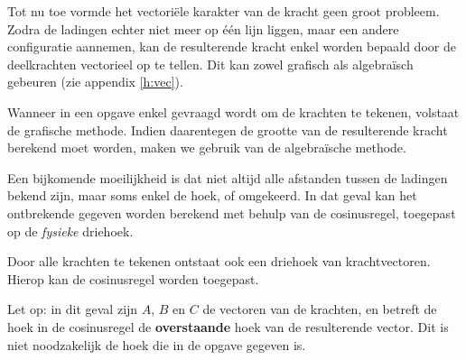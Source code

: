 Tot nu toe vormde het vectoriële karakter van de kracht geen groot probleem. Zodra de ladingen echter niet meer op één lijn liggen, maar een andere configuratie aannemen, kan de resulterende kracht enkel worden bepaald door de deelkrachten vectorieel op te tellen. Dit kan zowel grafisch als algebraïsch gebeuren (zie appendix \ref{h:vec}).

Wanneer in een opgave enkel gevraagd wordt om de krachten te tekenen, volstaat de grafische methode. Indien daarentegen de grootte van de resulterende kracht berekend moet worden, maken we gebruik van de algebraïsche methode.

Een bijkomende moeilijkheid is dat niet altijd alle afstanden tussen de ladingen bekend zijn, maar soms enkel de hoek, of omgekeerd. In dat geval kan het ontbrekende gegeven worden berekend met behulp van de cosinusregel, toegepast op de \textsl{fysieke} driehoek.

Door alle krachten te tekenen ontstaat ook een driehoek van krachtvectoren. Hierop kan de cosinusregel worden toegepast.

\begin{opm}
Let op: in dit geval zijn $A$, $B$ en $C$ de vectoren van de krachten, en betreft de hoek in de cosinusregel de \textbf{overstaande} hoek van de resulterende vector. Dit is niet noodzakelijk de hoek die in de opgave gegeven is.
\end{opm}


